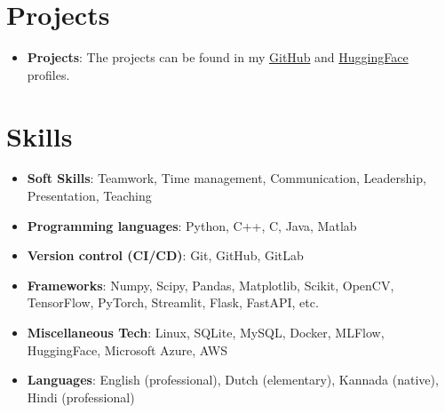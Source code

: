 \documentclass[letterpaper, 10pt]{article}
\newcommand{\resumeItem}[2]{
    \item\small{
        \textbf{#1}{: #2 \vspace{-2pt}}
    }
}
\newcommand{\resumeSubItem}[2]{\resumeItem{#1}{#2}\vspace{-4pt}}
\newcommand{\resumeSubHeadingListStart}{\begin{itemize}[leftmargin=*]}
\newcommand{\resumeSubHeadingListEnd}{\end{itemize}\vspace{-5pt}}
\begin{document}

\section{Projects}
    \resumeSubHeadingListStart
        \resumeSubItem{Projects}
        {The projects can be found in my \href{https://github.com/AbhishekRS4/}{GitHub} and \href{https://huggingface.co/abhishekrs4}{HuggingFace} profiles.}
    \resumeSubHeadingListEnd

\section{Skills}
    \resumeSubHeadingListStart
        \resumeSubItem{Soft Skills}
        {Teamwork, Time management, Communication, Leadership, Presentation, Teaching}
        \resumeSubItem{Programming languages}
        {Python, C++, C, Java, Matlab}
        \resumeSubItem{Version control (CI/CD)}
        {Git, GitHub, GitLab}
        \resumeSubItem{Frameworks}
        {Numpy, Scipy, Pandas, Matplotlib, Scikit, OpenCV, TensorFlow, PyTorch, Streamlit, Flask, FastAPI, etc.}
        \resumeSubItem{Miscellaneous Tech}
        {Linux, SQLite, MySQL, Docker, MLFlow, HuggingFace, Microsoft Azure, AWS}
        \resumeSubItem{Languages}
        {English (professional), Dutch (elementary), Kannada (native), Hindi (professional)}
    \resumeSubHeadingListEnd
\end{document}
